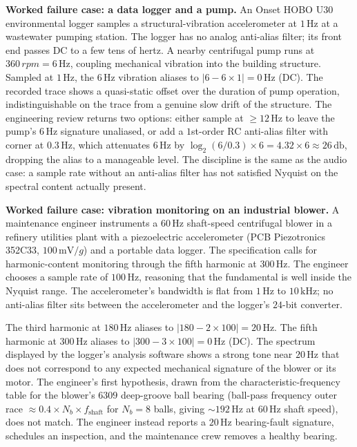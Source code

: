 \textbf{Worked failure case: a data logger and a pump.} An Onset
HOBO U30 environmental logger samples a structural-vibration
accelerometer at $1 \,\si{\hertz}$ at a wastewater pumping station.
The logger has no analog anti-alias filter; its front end passes
DC to a few tens of hertz. A nearby centrifugal pump runs at
$360 \,\si{rpm} = 6 \,\si{\hertz}$, coupling mechanical vibration
into the building structure. Sampled at $1 \,\si{\hertz}$, the
$6 \,\si{\hertz}$ vibration aliases to $|6 - 6 \times 1| = 0 \,\si
{\hertz}$ (DC). The recorded trace shows a quasi-static offset
over the duration of pump operation, indistinguishable on the trace
from a genuine slow drift of the structure. The engineering review
returns two options: either sample at $\geq 12 \,\si{\hertz}$ to
leave the pump's $6 \,\si{\hertz}$ signature unaliased, or add a
$1$st-order RC anti-alias filter with corner at $0.3 \,\si{\hertz}$,
which attenuates $6 \,\si{\hertz}$ by $\log_{2}(6/0.3) \times 6 =
4.32 \times 6 \approx 26 \,\si{\decibel}$, dropping the alias to a
manageable level. The discipline is the same as the audio case: a
sample rate without an anti-alias filter has not satisfied Nyquist
on the spectral content actually present.

\textbf{Worked failure case: vibration monitoring on an industrial
blower.} A maintenance engineer instruments a $60 \,\si{\hertz}$
shaft-speed centrifugal blower in a refinery utilities plant with a
piezoelectric accelerometer (PCB Piezotronics 352C33,
$100 \,\si{\milli\volt}/g$) and a portable data logger. The
specification calls for harmonic-content monitoring through the
fifth harmonic at $300 \,\si{\hertz}$. The engineer chooses a
sample rate of $100 \,\si{\hertz}$, reasoning that the fundamental
is well inside the Nyquist range. The accelerometer's bandwidth is
flat from $1 \,\si{\hertz}$ to $10 \,\si{\kilo\hertz}$; no
anti-alias filter sits between the accelerometer and the logger's
$24$-bit converter.

The third harmonic at $180 \,\si{\hertz}$ aliases to
$|180 - 2 \times 100| = 20 \,\si{\hertz}$. The fifth harmonic at
$300 \,\si{\hertz}$ aliases to $|300 - 3 \times 100| = 0 \,\si
{\hertz}$ (DC). The spectrum displayed by the logger's analysis
software shows a strong tone near $20 \,\si{\hertz}$ that does not
correspond to any expected mechanical signature of the blower or
its motor. The engineer's first hypothesis, drawn from the
characteristic-frequency table for the blower's $6309$ deep-groove
ball bearing (ball-pass frequency outer race
$\approx 0.4 \times N_{b} \times f_{\text{shaft}}$ for $N_{b} = 8$
balls, giving $\sim 192 \,\si{\hertz}$ at $60 \,\si{\hertz}$ shaft
speed), does not match. The engineer instead reports a
$20 \,\si{\hertz}$ bearing-fault signature, schedules an
inspection, and the maintenance crew removes a healthy bearing.

